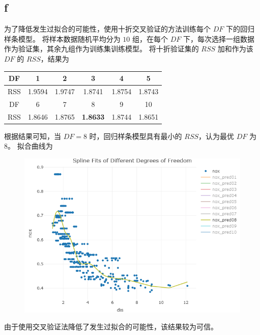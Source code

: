 \documentclass[12pt,a4paper]{article}
\begin{document}
    \subsection*{f}
    为了降低发生过拟合的可能性，使用十折交叉验证的方法训练每个 $DF$ 下的回归样条模型。
    将样本数据随机平均分为 $10$ 组，在每个 $DF$ 下，每次选择一组数据作为验证集，其余九组作为训练集训练模型。
    将十折验证集的 $RSS$ 加和作为该 $DF$ 的 $RSS$，结果为
    \begin{longtable}{c|c|c|c|c|c}
        \hline
        DF & 1 & 2 & 3 & 4 & 5\\
        \hline
        RSS & 1.9594 & 1.9747 & 1.8741 & 1.8754 & 1.8743\\
        \hline
        \hline
        DF & 6 & 7 & 8 & 9 & 10\\
        \hline
        RSS & 1.8646 & 1.8765 & \textbf{1.8633} & 1.8744 & 1.8651\\
        \hline
    \end{longtable}
    根据结果可知，当 $DF=8$ 时，回归样条模型具有最小的 $RSS$，认为最优 $DF$ 为 $8$。
    拟合曲线为
    \begin{figure}[H]
        \centering
        \includegraphics[scale=0.6]{RegSpline8Fit.png}
    \end{figure}
    由于使用交叉验证法降低了发生过拟合的可能性，该结果较为可信。
\end{document}

